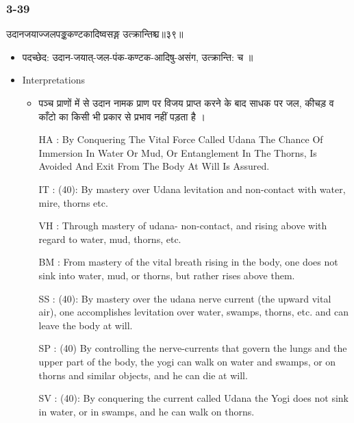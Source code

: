\begin{frame}[fragile]\frametitle{3-39}
\begin{sanskrit}
उदानजयाज्जलपङ्ककण्टकादिष्वसङ्ग उत्क्रान्तिश्च॥३९॥
\end{sanskrit}

	\begin{itemize}
	\item पदच्छेद:  उदान-जयात्-जल-पंक-कण्टक-आदिषु-असंग, उत्क्रान्ति: च ॥
	\item Interpretations
		\begin{itemize}	
		\item पञ्च प्राणों में से उदान नामक प्राण पर विजय प्राप्त करने के बाद साधक पर  जल, कीचड़ व काँटो का किसी भी प्रकार से प्रभाव नहीं पड़ता है ।
		\item [HA]: By Conquering The Vital Force Called Udana The Chance Of Immersion In Water Or Mud, Or Entanglement In The Thorns, Is Avoided And Exit From The Body At Will Is Assured.
		\item [IT]: (40): By mastery over Udana levitation and non-contact with water, mire, thorns etc.
		\item [VH]: Through mastery of udana- non-contact, and rising above with regard to water, mud, thorns, etc.
		\item [BM]: From mastery of the vital breath rising in the body, one does not sink into water, mud, or thorns, but rather rises above them.
		\item [SS]: (40): By mastery over the udana nerve current (the upward vital air), one accomplishes levitation over water, swamps, thorns, etc. and can leave the body at will.
		\item [SP]: (40) By controlling the nerve-currents that govern the lungs and the upper part of the body, the yogi can walk on water and swamps, or on thorns and similar objects, and he can die at will.
		\item [SV]: (40): By conquering the current called Udana the Yogi does not sink in water, or in swamps, and he can walk on thorns. 
		\end{itemize}
	\end{itemize}
\end{frame}


